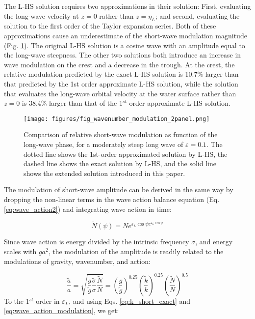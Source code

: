 \documentclass[draft]{agujournal2019}
\begin{document}
The L-HS solution requires two approximations in their solution:
First, evaluating the long-wave velocity at $z = 0$
rather than $z = \eta_L$; and second, evaluating the solution to the first order
of the Taylor expansion series.
Both of these approximations cause an underestimate of the short-wave
modulation magnitude (Fig. \ref{fig:wavenumber_modulation}).
The original L-HS solution is a cosine wave with an amplitude equal
to the long-wave steepness.
The other two solutions both introduce an increase in wave modulation
on the crest and a decrease in the trough.
At the crest, the relative modulation predicted by the exact L-HS solution
is 10.7\% larger than that predicted by the 1st order approximate L-HS
solution, while the solution that evaluates the long-wave orbital velocity
at the water surface rather than $z = 0$ is 38.4\% larger than that of the
1$^{st}$ order approximate L-HS solution.

\begin{figure}[h]
\label{fig:wavenumber_modulation}
\centering
\texttt{[image: figures/fig\_wavenumber\_modulation\_2panel.png]}
\caption{
  Comparison of relative short-wave modulation as function of the
  long-wave phase, for a moderately steep long wave of $\varepsilon = 0.1$.
  The dotted line shows the 1st-order approximated solution by L-HS,
  the dashed line shows the exact solution by L-HS,
  and the solid line shows the extended solution introduced in this paper.
}
\end{figure}

The modulation of short-wave amplitude can be derived in the same way by
dropping the non-linear terms in the wave action balance equation
(Eq. \ref{eq:wave_action2}) and integrating wave action in time:

\begin{equation}
\label{eq:wave_action_modulation}
\widetilde{N}(\psi) = N e^{\varepsilon_L \cos{\psi} e^{\varepsilon_L \cos{\psi}}}
\end{equation}

Since wave action is energy divided by the intrinsic frequency $\sigma$,
and energy scales with $ga^2$, the modulation of the amplitude is readily
related to the modulations of gravity, wavenumber, and action:

\begin{equation}
\label{eq:wave_amplitude_modulation}
\dfrac{\widetilde{a}}{a} = \sqrt{
  \dfrac{g}{\widetilde{g}}
  \dfrac{\widetilde{\sigma}}{\sigma}
  \dfrac{\widetilde{N}}{N}}
=
  \left( \dfrac{g}{\widetilde{g}} \right)^{0.25}
  \left( \dfrac{\widetilde{k}}{k} \right)^{0.25}
  \left( \dfrac{\widetilde{N}}{N} \right)^{0.5}
\end{equation}
To the 1$^{st}$ order in $\varepsilon_L$, and using Eqs. \ref{eq:k_short_exact}
and \ref{eq:wave_action_modulation}, we get:
\end{document}

